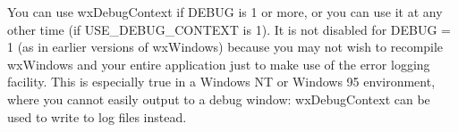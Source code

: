 You can use wxDebugContext if DEBUG is 1 or more, or you can use it
at any other time (if USE\_DEBUG\_CONTEXT is 1). It is not disabled
for DEBUG = 1 (as in earlier versions of wxWindows) because you
may not wish to recompile wxWindows and your entire application
just to make use of the error logging facility. This is especially
true in a Windows NT or Windows 95 environment, where you cannot
easily output to a debug window: wxDebugContext can be used to
write to log files instead.

